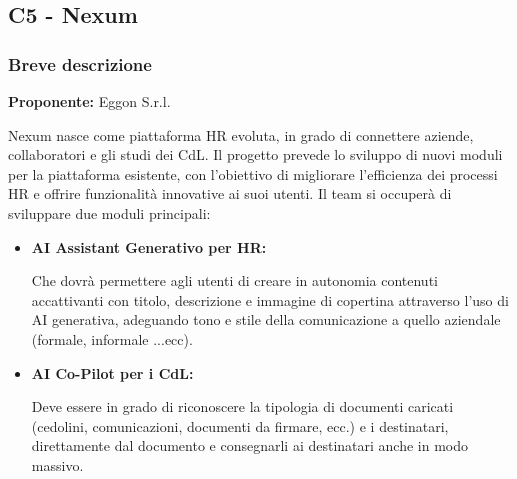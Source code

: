 \documentclass[a4paper,11pt]{article}
\begin{document}
\newpage
\subsection{C5 - Nexum}
\subsubsection{Breve descrizione}
\textbf{Proponente:} Eggon S.r.l.
\vspace{0.5em}\\
\parbox[t]{\linewidth}{%
Nexum nasce come piattaforma HR evoluta, in grado di connettere aziende, collaboratori e gli studi dei CdL. Il progetto prevede lo sviluppo di nuovi moduli per la piattaforma esistente, con l'obiettivo di migliorare l'efficienza dei processi HR e offrire funzionalità innovative ai suoi utenti.
Il team si occuperà di sviluppare due moduli principali:
}

\begin{itemize}
\item \textbf{AI Assistant Generativo per HR:} \\
\begin{minipage}[t]{\dimexpr\linewidth-2em}
Che dovrà permettere agli utenti di creare in autonomia contenuti accattivanti con titolo, descrizione e immagine di copertina attraverso l'uso di AI generativa, adeguando tono e stile della comunicazione a quello aziendale (formale, informale ...ecc).
\end{minipage}

\item \textbf{AI Co-Pilot per i CdL:} \\
\begin{minipage}[t]{\dimexpr\linewidth-2em}
Deve essere in grado di riconoscere la tipologia di documenti caricati (cedolini, comunicazioni, documenti da firmare, ecc.) e i destinatari, direttamente dal documento e consegnarli ai destinatari anche in modo massivo.
\end{minipage}
\end{itemize}
\end{document}
